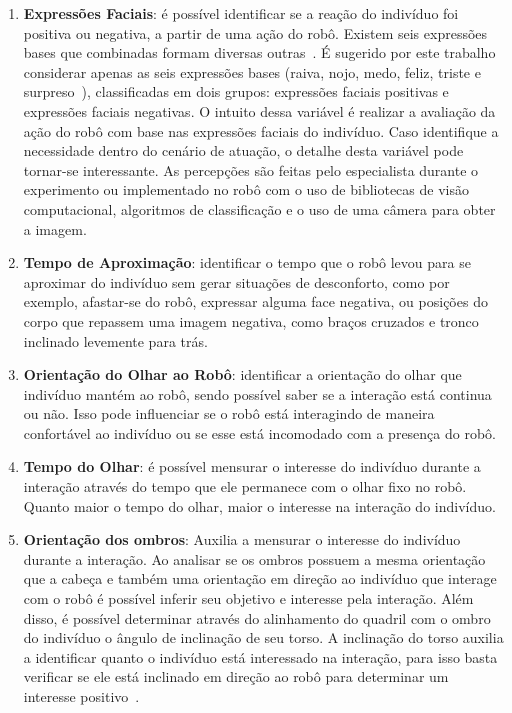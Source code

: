 \begin{enumerate}
    \item \textbf{Expressões Faciais}: é possível identificar se a reação do indivíduo foi positiva ou negativa, a partir de uma ação do robô. Existem seis expressões bases que combinadas formam diversas outras~\cite{bihan:2014}. É sugerido por este trabalho considerar apenas as seis expressões bases (raiva, nojo, medo, feliz, triste e surpreso~\cite{kaitai:2011}), classificadas em dois grupos: expressões faciais positivas e expressões faciais negativas. O intuito dessa variável é realizar a avaliação da ação do robô com base nas expressões faciais do indivíduo. Caso identifique a necessidade dentro do cenário de atuação, o detalhe desta variável pode tornar-se interessante. As percepções são feitas pelo especialista durante o experimento ou implementado no robô com o uso de bibliotecas de visão computacional, algoritmos de classificação e o uso de uma câmera para obter a imagem.
    \item \textbf{Tempo de Aproximação}: identificar o tempo que o robô levou para se aproximar do indivíduo sem gerar situações de desconforto, como por exemplo, afastar-se do robô, expressar alguma face negativa, ou posições do corpo que repassem uma imagem negativa, como braços cruzados e tronco inclinado levemente para trás.
    \item \textbf{Orientação do Olhar ao Robô}: identificar a orientação do olhar que indivíduo mantém ao robô, sendo possível saber se a interação está continua ou não. Isso pode influenciar se o robô está interagindo de maneira confortável ao indivíduo ou se esse está incomodado com a presença do robô.
    \item \textbf{Tempo do Olhar}: é possível mensurar o interesse do indivíduo durante a interação através do tempo que ele permanece com o olhar fixo no robô. Quanto maior o tempo do olhar, maior o interesse na interação do indivíduo.
    \item \textbf{Orientação dos ombros}: Auxilia a mensurar o interesse do indivíduo durante a interação. Ao analisar se os ombros possuem a mesma orientação que a cabeça e também uma orientação em direção ao indivíduo que interage com o robô é possível inferir seu objetivo e interesse pela interação. Além disso, é possível determinar através do alinhamento do quadril com o ombro do indivíduo o ângulo de inclinação de seu torso. A inclinação do torso auxilia a identificar quanto o indivíduo está interessado na interação, para isso basta verificar se ele está inclinado em direção ao robô para determinar um interesse positivo~\cite{lambert:2008}.

\end{enumerate}
